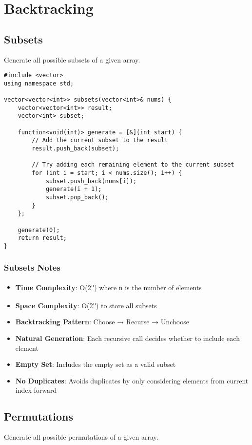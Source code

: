 \documentclass[11pt,a4paper]{article}
\begin{document}
\newpage

\section{Backtracking}

\subsection{Subsets}
Generate all possible subsets of a given array.

\begin{lstlisting}[caption={Subsets Implementation}]
#include <vector>
using namespace std;

vector<vector<int>> subsets(vector<int>& nums) {
    vector<vector<int>> result;
    vector<int> subset;
    
    function<void(int)> generate = [&](int start) {
        // Add the current subset to the result
        result.push_back(subset);
        
        // Try adding each remaining element to the current subset
        for (int i = start; i < nums.size(); i++) {
            subset.push_back(nums[i]);
            generate(i + 1);
            subset.pop_back();
        }
    };
    
    generate(0);
    return result;
}
\end{lstlisting}

\subsubsection*{Subsets Notes}
\begin{itemize}
\item \textbf{Time Complexity}: O(2\textsuperscript{n}) where n is the number of elements
\item \textbf{Space Complexity}: O(2\textsuperscript{n}) to store all subsets
\item \textbf{Backtracking Pattern}: Choose → Recurse → Unchoose
\item \textbf{Natural Generation}: Each recursive call decides whether to include each element
\item \textbf{Empty Set}: Includes the empty set as a valid subset
\item \textbf{No Duplicates}: Avoids duplicates by only considering elements from current index forward
\end{itemize}

\newpage
\subsection{Permutations}
Generate all possible permutations of a given array.
\end{document}
